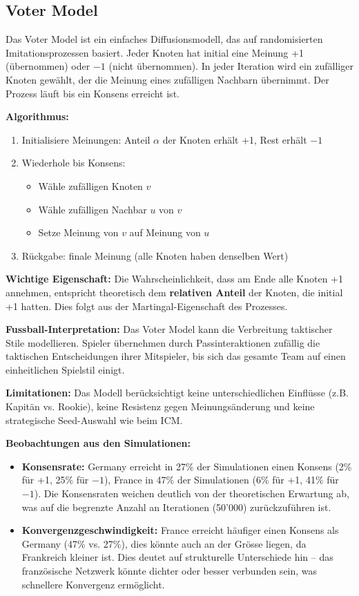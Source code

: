 \subsection{Voter Model}

Das Voter Model ist ein einfaches Diffusionsmodell, das auf randomisierten Imitationsprozessen basiert. Jeder Knoten hat initial eine Meinung +1 (übernommen) oder $-1$ (nicht übernommen). In jeder Iteration wird ein zufälliger Knoten gewählt, der die Meinung eines zufälligen Nachbarn übernimmt. Der Prozess läuft bis ein Konsens erreicht ist.

\textbf{Algorithmus:}
\begin{enumerate}
  \item Initialisiere Meinungen: Anteil $\alpha$ der Knoten erhält +1, Rest erhält $-1$
  \item Wiederhole bis Konsens:
  \begin{itemize}
    \item Wähle zufälligen Knoten $v$
    \item Wähle zufälligen Nachbar $u$ von $v$
    \item Setze Meinung von $v$ auf Meinung von $u$
  \end{itemize}
  \item Rückgabe: finale Meinung (alle Knoten haben denselben Wert)
\end{enumerate}

\textbf{Wichtige Eigenschaft:} Die Wahrscheinlichkeit, dass am Ende alle Knoten +1 annehmen, entspricht theoretisch dem \textbf{relativen Anteil} der Knoten, die initial +1 hatten. Dies folgt aus der Martingal-Eigenschaft des Prozesses.

\textbf{Fussball-Interpretation:} Das Voter Model kann die Verbreitung taktischer Stile modellieren. Spieler übernehmen durch Passinteraktionen zufällig die taktischen Entscheidungen ihrer Mitspieler, bis sich das gesamte Team auf einen einheitlichen Spielstil einigt.

\textbf{Limitationen:} Das Modell berücksichtigt keine unterschiedlichen Einflüsse (z.B. Kapitän vs. Rookie), keine Resistenz gegen Meinungsänderung und keine strategische Seed-Auswahl wie beim ICM.

\textbf{Beobachtungen aus den Simulationen:}
\begin{itemize}
  \item \textbf{Konsensrate:} Germany erreicht in 27\% der Simulationen einen Konsens (2\% für +1, 25\% für $-1$), France in 47\% der Simulationen (6\% für +1, 41\% für $-1$). Die Konsensraten weichen deutlich von der theoretischen Erwartung ab, was auf die begrenzte Anzahl an Iterationen (50'000) zurückzuführen ist.
  \item \textbf{Konvergenzgeschwindigkeit:} France erreicht häufiger einen Konsens als Germany (47\% vs. 27\%), dies könnte auch an der Grösse liegen, da Frankreich kleiner ist. Dies deutet auf strukturelle Unterschiede hin -- das französische Netzwerk könnte dichter oder besser verbunden sein, was schnellere Konvergenz ermöglicht.
\end{itemize}

